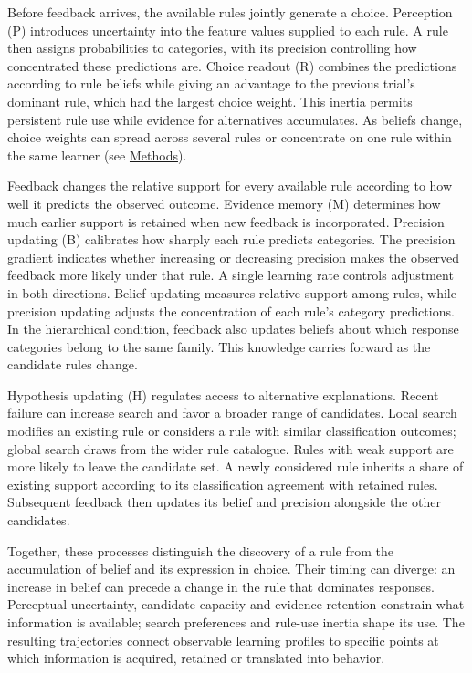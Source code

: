 Before feedback arrives, the available rules jointly generate a choice.
Perception (P) introduces uncertainty into the feature values supplied to each
rule. A rule then assigns probabilities to categories, with its precision
controlling how concentrated these predictions are. Choice readout (R) combines
the predictions according to rule beliefs while giving an advantage to the
previous trial's dominant rule, which had the largest choice weight. This
inertia permits persistent rule use while
evidence for alternatives accumulates. As beliefs change, choice weights
can spread across several rules or concentrate on one rule within the same
learner (see \hyperref[m:choice]{Methods}).

Feedback changes the relative support for every available rule according to
how well it predicts the observed outcome. Evidence memory (M) determines how
much earlier support is retained when new feedback is
incorporated. Precision updating (B) calibrates how sharply each rule predicts
categories. The precision gradient indicates whether increasing or decreasing
precision makes the observed feedback more likely under that rule. A single
learning rate controls adjustment in both directions. Belief updating measures
relative support among rules, while precision updating adjusts the
concentration of each rule's category predictions. In the hierarchical condition,
feedback also updates beliefs about which response categories belong to the
same family. This knowledge carries forward as the candidate rules change.

Hypothesis updating (H) regulates access to alternative explanations. Recent
failure can increase search and favor a broader range of candidates. Local
search modifies an existing rule or considers a rule with similar
classification outcomes; global search draws from the wider rule catalogue.
Rules with weak support are more likely to leave the candidate set. A newly
considered rule inherits a share of existing support according to its
classification agreement with retained rules. Subsequent feedback then
updates its belief and precision alongside the other candidates.

Together, these processes distinguish the discovery of a rule from the
accumulation of belief and its expression in choice. Their timing can
diverge: an increase in belief can precede a change in the rule that dominates
responses. Perceptual uncertainty, candidate capacity and evidence retention
constrain what information is available; search preferences and rule-use
inertia shape its use. The resulting trajectories connect observable learning
profiles to specific points at which information is acquired, retained or
translated into behavior.

